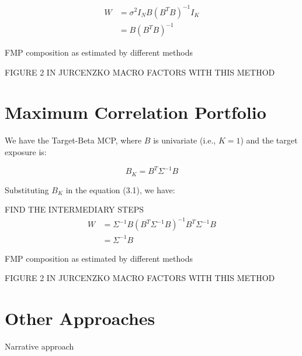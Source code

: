 \begin{equation}
    \begin{aligned}
        W &= {\sigma^2}I_N B (B^T B)^{-1} I_K \\
        &= B (B^T B)^{-1}
    \end{aligned}
\end{equation}


FMP composition as estimated by different methods

FIGURE 2 IN JURCENZKO MACRO FACTORS WITH THIS METHOD

\section{Maximum Correlation Portfolio}

We have the Target-Beta MCP, where 
$B$ is univariate (i.e., $K = 1$) and the
target exposure is:

\begin{equation}
    B_K = B^T \Sigma^{-1} B
\end{equation}

Substituting $B_K$ in the equation (3.1), we have:

FIND THE INTERMEDIARY STEPS
\begin{equation}
    \begin{aligned}
        W &= \Sigma^{-1} B (B^T \Sigma^{-1} B)^{-1} B^T \Sigma^{-1} B \\
        &= \Sigma^{-1} B
    \end{aligned}
\end{equation}


FMP composition as estimated by different methods

FIGURE 2 IN JURCENZKO MACRO FACTORS WITH THIS METHOD

\section{Other Approaches}

Narrative approach